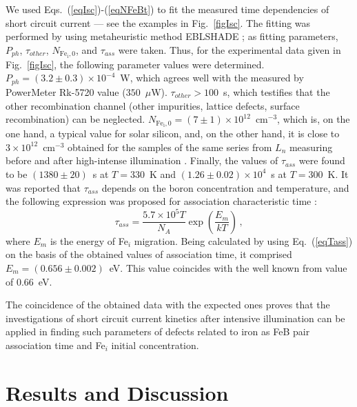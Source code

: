 \documentclass[sn-mathphys]{sn-jnl}%
\theoremstyle{thmstyleone}%
\theoremstyle{thmstyletwo}%
\theoremstyle{thmstylethree}%
\begin{document}
We used Eqs.~(\ref{eqIsc})-(\ref{eqNFeBt}) to fit the measured time dependencies of short circuit current ---
see the examples in Fig.~\ref{figIsc}.
The fitting was performed by using metaheuristic method EBLSHADE \cite{EBLSHADE};
as fitting parameters, $P_{ph}$, $\tau_{other}$, $N_\mathrm{Fe_i,0}$, and $\tau_{ass}$ were taken.
Thus, for the experimental data given in Fig.~\ref{figIsc}, the following parameter
values were determined.
$P_{ph}=(3.2\pm0.3)\times 10^{-4}$~W, which agrees well with the measured by PowerMeter Rk-5720 value
($350$~$\mu$W).
$\tau_{other}>100$~s,  which testifies that the other recombination channel 
(other impurities, lattice defects, surface recombination) can be neglected.
$N_\mathrm{Fe_i,0}=(7\pm1)\times10^{12}$~cm$^{-3}$,
which is, on the one hand, 
a typical value for solar silicon, and, on the other hand, 
it is close to $3\times10^{12}$~cm$^{-3}$
obtained for the samples of the same series 
from $L_n$ measuring before and after high-intense illumination \cite{FeB_Zong}.
Finally, the values of $\tau_{ass}$ were found
to be $(1380\pm20)$~s at $T=330$~K and $(1.26\pm0.02)\times10^4$~s at $T=300$~K.
It was reported that $\tau_{ass}$ depends on the boron concentration and temperature,
and the following expression was proposed for association characteristic time \cite{FeBAssJAP2014}:
\begin{equation}
\label{eqTass}
\tau_{ass}=\frac{5.7\times10^5T}{N_A}\exp\left(\frac{E_m}{kT}\right)\,,
\end{equation}
where
$E_m$ is the energy of Fe$_i$ migration.
Being calculated by using Eq.~(\ref{eqTass}) on the basis of the obtained
values of association time, it comprised $E_m=(0.656\pm0.002)$~eV.
This value coincides with the well known from \cite{FeBAssJAP2014,FeBkinAPL2008} value  of 0.66~eV.

The coincidence of the obtained data with the expected ones
proves that the investigations of short circuit current kinetics
after intensive illumination can be applied in finding such parameters of defects related to iron
as FeB pair association time and Fe$_i$ initial concentration.

\section{Results and Discussion}
\end{document}
